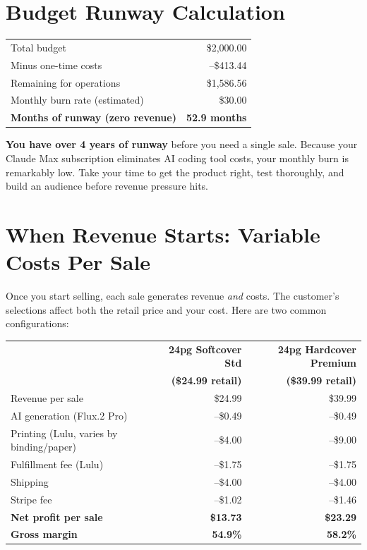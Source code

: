 \documentclass[12pt, letterpaper, oneside]{book}
\begin{document}
\section{Budget Runway Calculation}

\begin{table}[H]
\centering
\begin{tabular}{lr}
\toprule
Total budget & \$2{,}000.00 \\
Minus one-time costs & --\$413.44 \\
\midrule
Remaining for operations & \$1{,}586.56 \\
Monthly burn rate (estimated) & \$30.00 \\
\midrule
\textbf{Months of runway (zero revenue)} & \textbf{52.9 months} \\
\bottomrule
\end{tabular}
\end{table}

\begin{successbox}
\textbf{You have over 4 years of runway} before you need a single sale. Because your Claude Max subscription eliminates AI coding tool costs, your monthly burn is remarkably low. Take your time to get the product right, test thoroughly, and build an audience before revenue pressure hits.
\end{successbox}

\section{When Revenue Starts: Variable Costs Per Sale}

Once you start selling, each sale generates revenue \textit{and} costs. The customer's selections affect both the retail price and your cost. Here are two common configurations:

\begin{table}[H]
\centering
\small
\begin{tabular}{lrr}
\toprule
& \textbf{24pg Softcover Std} & \textbf{24pg Hardcover Premium} \\
& \textbf{(\$24.99 retail)} & \textbf{(\$39.99 retail)} \\
\midrule
Revenue per sale & \$24.99 & \$39.99 \\
AI generation (Flux.2 Pro) & --\$0.49 & --\$0.49 \\
Printing (Lulu, varies by binding/paper) & --\$4.00 & --\$9.00 \\
Fulfillment fee (Lulu) & --\$1.75 & --\$1.75 \\
Shipping & --\$4.00 & --\$4.00 \\
Stripe fee & --\$1.02 & --\$1.46 \\
\midrule
\textbf{Net profit per sale} & \textcolor{success}{\textbf{\$13.73}} & \textcolor{success}{\textbf{\$23.29}} \\
\textbf{Gross margin} & \textcolor{success}{\textbf{54.9\%}} & \textcolor{success}{\textbf{58.2\%}} \\
\bottomrule
\end{tabular}
\end{table}
\end{document}
